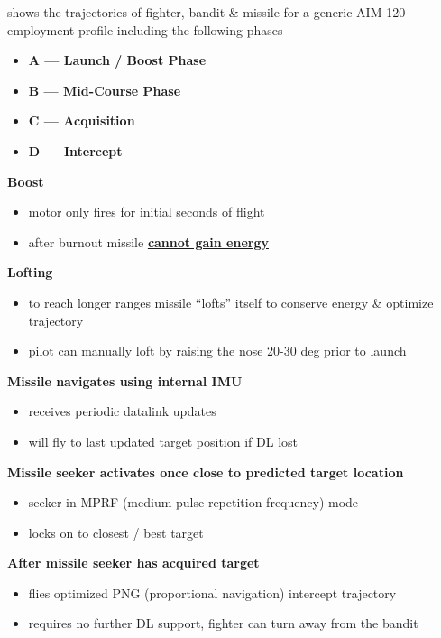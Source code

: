 \begin{tcoloritemize}
     shows the trajectories of fighter, bandit \& missile for a generic AIM-120 employment profile
    including the following phases

    \begin{itemize}
        \item \textbf{A --- Launch / Boost Phase}
        \item \textbf{B --- Mid-Course Phase}
        \item \textbf{C --- Acquisition}
        \item \textbf{D --- Intercept}
    \end{itemize}
    \textbf{Boost}

    \begin{itemize}
        \item motor only fires for initial seconds of flight 
        \item after burnout missile \textbf{\underline{cannot gain energy}}
    \end{itemize}

    \textbf{Lofting} 

    \begin{itemize}
        \item to reach longer ranges missile ``lofts'' itself to conserve energy \& optimize trajectory
        \item pilot can manually loft by raising the nose 20-30 deg prior to launch
    \end{itemize}
    \textbf{Missile navigates using internal IMU}

    \begin{itemize}
        \item receives periodic datalink updates
        \item will fly to last updated target position if DL lost
    \end{itemize}
    \textbf{Missile seeker activates once close to predicted target location}
    \begin{itemize}
        \item seeker in MPRF (medium pulse-repetition frequency) mode 
        \item locks on to closest / best target
    \end{itemize}
    \textbf{After missile seeker has acquired target}
    \begin{itemize}
        \item flies optimized PNG (proportional navigation) intercept trajectory
        \item requires no further DL support, fighter can turn away from the bandit
    \end{itemize}
\end{tcoloritemize}

